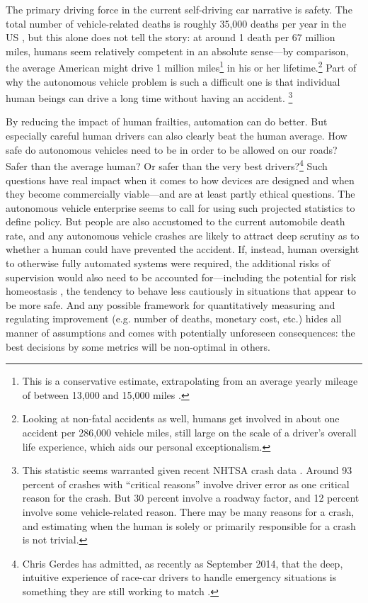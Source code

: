The primary driving force in the current self-driving car
narrative is safety. The total number of vehicle-related deaths is 
roughly 35,000 deaths per year in the US \cite{censusDeaths}, but this alone 
does not tell the story: at around 1 death per 67 million miles, humans seem relatively
competent in an absolute sense---by comparison, the average American might
drive 1 million miles\footnote{This is a conservative estimate,
  extrapolating from an average yearly mileage of between 13,000 and
  15,000 miles \cite{fhwa}.} in his or her lifetime.\footnote{Looking at non-fatal
accidents as well, humans get involved in about one accident per
286,000 vehicle miles, still large on the scale of a driver's overall
life experience, which aids our personal exceptionalism.} Part of why
the autonomous vehicle problem is 
such a difficult one is that individual human beings can drive a long
time without having an accident. \footnote{This statistic seems warranted given recent NHTSA crash
  data \cite{NHTSAcrash}. Around 93 percent of crashes with ``critical
  reasons'' involve driver error as one critical reason for the crash.
  But 30 percent involve a roadway factor, and 12 percent involve some
vehicle-related reason. There may be many reasons for a crash, and
estimating when the human is solely or primarily responsible for a
crash is not trivial.}


By reducing the impact of human
frailties, automation can do better. But especially careful human
drivers can also clearly beat the human average. How safe do
autonomous vehicles need to be in order to be allowed on our roads?
Safer than the average human? Or safer than the very best
drivers?\footnote{Chris Gerdes has admitted, as recently as September
  2014, that the deep, intuitive experience of race-car drivers to
  handle emergency situations is something they are still working to
  match \cite{8truthsandmyths}.}
Such questions have real impact when it comes to how devices are
designed and when they become commercially viable---and are at least
partly ethical questions. The autonomous
vehicle enterprise seems to call for using such projected statistics
to define policy. But
people are also accustomed to the current automobile death rate, and
any autonomous vehicle crashes are likely to attract deep
scrutiny as
to whether a human could have prevented the accident. If,
instead, human oversight to otherwise fully automated systems were
required, the additional risks of supervision would also need to be
accounted for---including the potential for risk homeostasis
\cite{Wilde}, the tendency to
behave less cautiously in situations that appear to be more safe. And
any possible framework for 
  quantitatively measuring and regulating improvement (e.g. number of deaths,
  monetary cost, etc.) hides all manner of assumptions and comes with
  potentially unforeseen consequences: the best decisions by some
  metrics will be non-optimal in others. 

